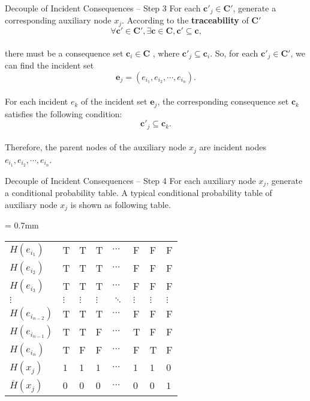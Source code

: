 \begin{frame}{Decouple of Incident Consequences -- Step 3}
     For each $\bm{c}'_j \in \bm{C}'$, generate a corresponding auxiliary node $x_j$. According to the \textbf{traceability} of $\bm{C}'$
     \[
        \forall \bm{c}' \in \bm{C}', \exists \bm{c} \in \bm{C}, \bm{c}' \subseteq \bm{c}\text{,}
     \]
     \vspace{-15pt}\\
     there must be a consequence set $\bm{c}_i \in \bm{C}$ , where $\bm{c}'_j \subseteq \bm{c}_i$. \pause So, for each $\bm{c}'_j \in \bm{C}'$, we can find the incident set
     \[
        \bm{e}_j = (e_{i_1},e_{i_2},\cdots,e_{i_n})\text{.}
     \]
     \vspace{-15pt}\\\pause
     For each incident $e_k$ of the incident set $\bm{e}_j$, the corresponding consequence set $\bm{c}_k$ satisfies the following condition:
     \[
        \bm{c}'_j \subseteq \bm{c}_k\text{.}
     \]
     \vspace{-15pt}\\\pause
     Therefore, the parent nodes of the auxiliary node $x_j$ are incident nodes $e_{i_1},e_{i_2},\cdots,e_{i_n}$.
\end{frame}

\begin{frame}{Decouple of Incident Consequences -- Step 4}
    For each auxiliary node $x_j$, generate a conditional probability table. A typical conditional probability table of auxiliary node $x_j$ is shown as following table.

    \extrarowsep = 0.7mm
    \begin{center}
      \begin{tabu}to 
        $H(e_{i_1})$        & T & T & T & $\cdots$ & F & F & F\\
        $H(e_{i_2})$        & T & T & T & $\cdots$ & F & F & F\\
        $H(e_{i_3})$        & T & T & T & $\cdots$ & F & F & F\\
        $\vdots$            & $\vdots$ & $\vdots$ & $\vdots$ & $\ddots$ & $\vdots$ & $\vdots$ & $\vdots$\\
        $H(e_{i_{n-2}})$    & T & T & T & $\cdots$ & F & F & F\\
        $H(e_{i_{n-1}})$    & T & T & F & $\cdots$ & T & F & F\\
        $H(e_{i_n})$        & T & F & F & $\cdots$ & F & T & F\\
        \hline
        $H(x_j)$            & $1$ & $1$ & $1$ & $\cdots$ & $1$ & $1$ & $0$ \\
        $\overline{H}(x_j)$ & $0$ & $0$ & $0$ & $\cdots$ & $0$ & $0$ & $1$
      \end{tabu}
    \end{center}




\end{frame}

